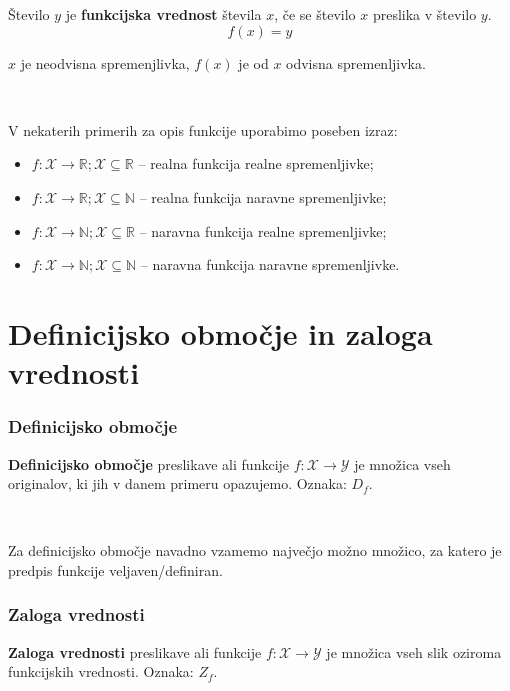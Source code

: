         Število $y$ je \textbf{funkcijska vrednost} števila $x$, če se število $x$ preslika v število $y$. 
        $$ f(x)=y $$

        $x$ je neodvisna spremenjlivka, $f(x)$ je od $x$ odvisna spremenljivka.


~

        V nekaterih primerih za opis funkcije uporabimo poseben izraz:
        \begin{itemize}
            \item $f:\mathcal{X}\to\mathbb{R}; \mathcal{X}\subseteq\mathbb{R}$ -- realna funkcija realne spremenljivke;
            \item $f:\mathcal{X}\to\mathbb{R}; \mathcal{X}\subseteq\mathbb{N}$ -- realna funkcija naravne spremenljivke;
            \item $f:\mathcal{X}\to\mathbb{N}; \mathcal{X}\subseteq\mathbb{R}$ -- naravna funkcija realne spremenljivke;
            \item $f:\mathcal{X}\to\mathbb{N}; \mathcal{X}\subseteq\mathbb{N}$ -- naravna funkcija naravne spremenljivke.
        \end{itemize}


\newpage
    \section{Definicijsko območje in zaloga vrednosti}

    \subsubsection*{Definicijsko območje}
        \textbf{Definicijsko območje} preslikave ali funkcije $f:\mathcal{X}\to\mathcal{Y}$ je množica vseh originalov, ki jih v danem primeru opazujemo. 
        Oznaka: $D_f$.                

~

        Za definicijsko območje navadno vzamemo največjo možno množico, za katero je predpis funkcije veljaven/definiran.

        
    \subsubsection*{Zaloga vrednosti}
        \textbf{Zaloga vrednosti} preslikave ali funkcije $f:\mathcal{X}\to\mathcal{Y}$ je množica vseh slik oziroma funkcijskih vrednosti.
        Oznaka: $Z_f$.

~

